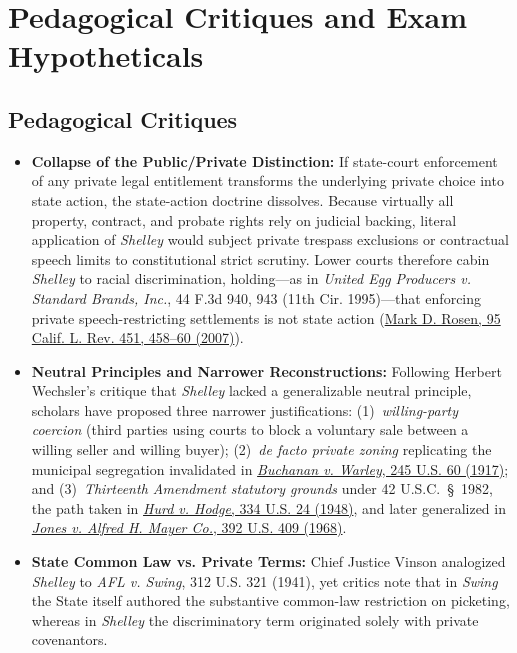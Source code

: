 \documentclass[12pt]{article}
\begin{document}
\section{Pedagogical Critiques and Exam Hypotheticals}

\subsection{Pedagogical Critiques}
\begin{itemize}
    \item \textbf{Collapse of the Public/Private Distinction:} If state-court enforcement of any private legal entitlement transforms the underlying private choice into state action, the state-action doctrine dissolves. Because virtually all property, contract, and probate rights rely on judicial backing, literal application of \textit{Shelley} would subject private trespass exclusions or contractual speech limits to constitutional strict scrutiny. Lower courts therefore cabin \textit{Shelley} to racial discrimination, holding---as in \textit{United Egg Producers v. Standard Brands, Inc.}, 44 F.3d 940, 943 (11th Cir. 1995)---that enforcing private speech-restricting settlements is not state action (\href{https://lawcat.berkeley.edu/record/1121131/files/fulltext.pdf}{Mark D. Rosen, 95 Calif. L. Rev. 451, 458--60 (2007)}).
    \item \textbf{Neutral Principles and Narrower Reconstructions:} Following Herbert Wechsler's critique that \textit{Shelley} lacked a generalizable neutral principle, scholars have proposed three narrower justifications: (1)~\textit{willing-party coercion} (third parties using courts to block a voluntary sale between a willing seller and willing buyer); (2)~\textit{de facto private zoning} replicating the municipal segregation invalidated in \href{https://supreme.justia.com/cases/federal/us/245/60/}{\textit{Buchanan v. Warley}, 245 U.S. 60 (1917)}; and (3)~\textit{Thirteenth Amendment statutory grounds} under 42 U.S.C.~\S~1982, the path taken in \href{https://supreme.justia.com/cases/federal/us/334/24/}{\textit{Hurd v. Hodge}, 334 U.S. 24 (1948)}, and later generalized in \href{https://supreme.justia.com/cases/federal/us/392/409/}{\textit{Jones v. Alfred H. Mayer Co.}, 392 U.S. 409 (1968)}.
    \item \textbf{State Common Law vs. Private Terms:} Chief Justice Vinson analogized \textit{Shelley} to \textit{AFL v. Swing}, 312 U.S. 321 (1941), yet critics note that in \textit{Swing} the State itself authored the substantive common-law restriction on picketing, whereas in \textit{Shelley} the discriminatory term originated solely with private covenantors.
\end{itemize}
\end{document}

